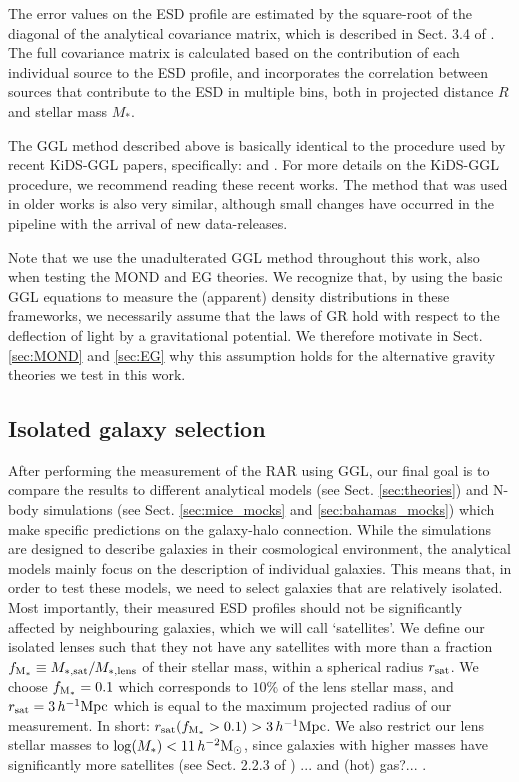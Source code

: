 \documentclass[usenatbib]{mnras}
\newcommand{\hmsun}{\,h^{-2} {\rm M_\odot}}
\newcommand{\hMpc}{\, h^{-1}{\rm{Mpc}} }
\newcommand{\un}[1]{_{\rm #1}}
\begin{document}
The error values on the ESD profile are estimated by the square-root of the diagonal of the analytical covariance matrix, which is described in Sect. 3.4 of \cite{viola2015}. The full covariance matrix is calculated based on the contribution of each individual source to the ESD profile, and incorporates the correlation between sources that contribute to the ESD in multiple bins, both in projected distance $R$ and stellar mass $M_*$.

The GGL method described above is basically identical to the procedure used by recent KiDS-GGL papers, specifically: \cite{dvornik2017,dvornik2018} and \cite{brouwer2017,brouwer2018}. For more details on the KiDS-GGL procedure, we recommend reading these recent works. The method that was used in older works \cite[]{viola2015,sifon2015,uitert2016,brouwer2016} is also very similar, although small changes have occurred in the pipeline with the arrival of new data-releases.

Note that we use the unadulterated GGL method throughout this work, also when testing the MOND and EG theories. We recognize that, by using the basic GGL equations to measure the (apparent) density distributions in these frameworks, we necessarily assume that the laws of GR hold with respect to the deflection of light by a gravitational potential. We therefore motivate in Sect. \ref{sec:MOND} and \ref{sec:EG} why this assumption holds for the alternative gravity theories we test in this work.


\subsection{Isolated galaxy selection}
\label{sec:isolation}

After performing the measurement of the RAR using GGL, our final goal is to compare the results to different analytical models (see Sect. \ref{sec:theories}) and N-body simulations (see Sect. \ref{sec:mice_mocks} and \ref{sec:bahamas_mocks}) which make specific predictions on the galaxy-halo connection. While the simulations are designed to describe galaxies in their cosmological environment, the analytical models mainly focus on the description of individual galaxies. This means that, in order to test these models, we need to select galaxies that are relatively isolated. Most importantly, their measured ESD profiles should not be significantly affected by neighbouring galaxies, which we will call `satellites'. We define our isolated lenses such that they not have any satellites with more than a fraction $f\un{M_*} \equiv M\un{*,sat}/M\un{*,lens}$ of their stellar mass, within a spherical radius $r\un{sat}$. We choose $f\un{M_*}=0.1$ which corresponds to $10\%$ of the lens stellar mass, and $r\un{sat}=3\hMpc$ which is equal to the maximum projected radius of our measurement. In short: $r\un{sat}(f\un{M_*}>0.1)>3\hMpc$. We also restrict our lens stellar masses to $\log(M_*)<11 \hmsun$, since galaxies with higher masses have significantly more satellites
(see Sect. 2.2.3 of \citealp{brouwer2017}) ... and (hot) gas?... .
\end{document}
